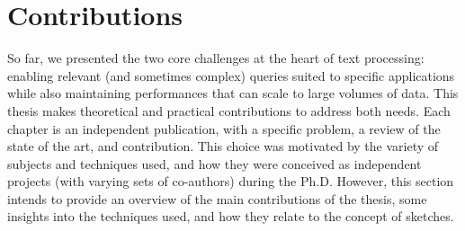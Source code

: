  \section{Contributions}\label{intro:sec:contrib}


So far, we presented the two core challenges at the heart of text processing: enabling relevant (and sometimes complex) queries suited to specific applications while also maintaining performances that can scale to large volumes of data.
%
This thesis makes theoretical and practical contributions to address both needs. 
Each chapter is  an independent publication, with a specific problem, a review of the state of the art, and contribution. This choice was motivated by the variety of subjects and techniques used, and how they were conceived as independent projects (with varying sets of co-authors) during the Ph.D. However, this section intends to provide an overview of the main contributions of the thesis, some insights into the techniques used, and how they relate to the concept of sketches.

